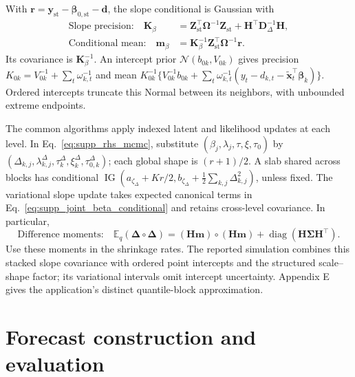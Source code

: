 \documentclass[12pt,letterpaper]{article}
\newcommand{\E}{\mathbb{E}}
\newcommand{\diag}{\operatorname{diag}}
\newcommand{\vect}[1]{\bm{#1}}
\newcommand{\mat}[1]{\bm{#1}}
\newcommand{\Normal}{\mathcal{N}}
\newcommand{\IG}{\operatorname{IG}}
\numberwithin{suppalgorithm}{section}
\numberwithin{equation}{section}
\numberwithin{table}{section}
\numberwithin{figure}{section}
\begin{document}
With \(\vect r=\vect y_{\mathrm{st}}-\vect\beta_{0,\mathrm{st}}-\vect d\),
the slope conditional is Gaussian with
\begin{equation}
\begin{aligned}
\text{Slope precision:}\quad
\mat K_\beta&=\mat Z_{\mathrm{st}}^\top\mat\Omega^{-1}
 \mat Z_{\mathrm{st}}+\mat H^\top\mat D_\Delta^{-1}\mat H,\\
\text{Conditional mean:}\quad
\vect m_\beta&=\mat K_\beta^{-1}\mat Z_{\mathrm{st}}^\top
 \mat\Omega^{-1}\vect r.
\end{aligned}
\label{eq:supp_joint_beta_conditional}
\end{equation}
Its covariance is \(\mat K_\beta^{-1}\). An intercept prior
\(\Normal(b_{0k},V_{0k})\) gives precision
\(K_{0k}=V_{0k}^{-1}+\sum_t\omega_{k,t}^{-1}\) and mean
\(K_{0k}^{-1}\{V_{0k}^{-1}b_{0k}+\sum_t\omega_{k,t}^{-1}
(y_t-d_{k,t}-\tilde{\vect x}_t^\top\vect\beta_k)\}\).
Ordered intercepts truncate this Normal between its neighbors, with
unbounded extreme endpoints.

The common algorithms apply indexed latent and likelihood updates at each
level. In Eq.~\eqref{eq:supp_rhs_mcmc}, substitute
\((\beta_j,\lambda_j,\tau,\xi,\tau_0)\) by
\((\Delta_{k,j},\lambda^\Delta_{k,j},\tau_k^\Delta,\xi_k^\Delta,
\tau_{0,k}^\Delta)\); each global shape is \((r+1)/2\). A slab shared
across blocks has conditional
\(\IG(a_{\zeta_\Delta}+Kr/2,
b_{\zeta_\Delta}+\tfrac12\sum_{k,j}\Delta_{k,j}^2)\), unless fixed.
The variational slope update takes expected canonical terms in
Eq.~\eqref{eq:supp_joint_beta_conditional} and retains cross-level
covariance. In particular,
\begin{equation}
\text{Difference moments:}\quad
\E_q(\vect\Delta\circ\vect\Delta)
=(\mat H\vect m)\circ(\mat H\vect m)
 +\diag(\mat H\mat\Sigma\mat H^\top).
\label{eq:supp_joint_increment_moments}
\end{equation}
Use these moments in the shrinkage rates. The reported simulation combines
this stacked slope covariance with ordered point intercepts and the
structured scale--shape factor; its variational intervals omit intercept
uncertainty. Appendix E gives the application's distinct quantile-block
approximation.

\section{Forecast construction and evaluation}
\label{sec:forecast_synthesis}
\end{document}
